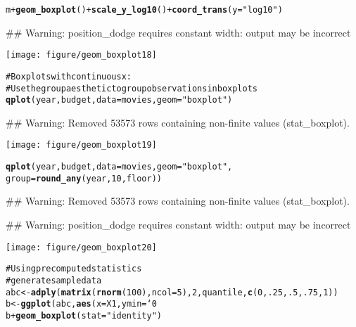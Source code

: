 \documentclass[a4paper,titlepage]{tufte-handout}\usepackage{graphicx, color}
\makeatletter
\def\maxwidth{ %
  \ifdim\Gin@nat@width>\linewidth
    \linewidth
  \else
    \Gin@nat@width
  \fi
}
\newcommand{\hlfunctioncall}[1]{\textcolor[rgb]{0.501960784313725,0,0.329411764705882}{\textbf{#1}}}%
\newcommand{\hlstring}[1]{\textcolor[rgb]{0.6,0.6,1}{#1}}%
\newcommand{\hlcomment}[1]{\textcolor[rgb]{0.180392156862745,0.6,0.341176470588235}{#1}}%
\newenvironment{kframe}{%
 \def\at@end@of@kframe{}%
 \ifinner\ifhmode%
  \def\at@end@of@kframe{\end{minipage}}%
  \begin{minipage}{\columnwidth}%
 \fi\fi%
 \def\FrameCommand##1{\hskip\@totalleftmargin \hskip-\fboxsep
 \colorbox{shadecolor}{##1}\hskip-\fboxsep
     \hskip-\linewidth \hskip-\@totalleftmargin \hskip\columnwidth}%
 \MakeFramed {\advance\hsize-\width
   \@totalleftmargin\z@ \linewidth\hsize
   \@setminipage}}%
 {\par\unskip\endMakeFramed%
 \at@end@of@kframe}
\newenvironment{knitrout}{}{} %
\makeatother
\begin{document}
\begin{knitrout}
\begin{kframe}
\begin{alltt}
m + \hlfunctioncall{geom_boxplot}() + \hlfunctioncall{scale_y_log10}() + \hlfunctioncall{coord_trans}(y = \hlstring{"log10"})
\end{alltt}
\begin{flushleft}\ttfamily\noindent\textcolor{warningcolor}{\#\# Warning: position\_dodge requires constant width: output may be incorrect}\end{flushleft}\end{kframe}\texttt{[image: figure/geom\_boxplot18]} \begin{kframe}\begin{alltt}
\hlcomment{# Boxplots with continuous x:}
\hlcomment{# Use the group aesthetic to group observations in boxplots}
\hlfunctioncall{qplot}(year, budget, data = movies, geom = \hlstring{"boxplot"})
\end{alltt}
\begin{flushleft}\ttfamily\noindent\textcolor{warningcolor}{\#\# Warning: Removed 53573 rows containing non-finite values (stat\_boxplot).}\end{flushleft}\end{kframe}\texttt{[image: figure/geom\_boxplot19]} \begin{kframe}\begin{alltt}
\hlfunctioncall{qplot}(year, budget, data = movies, geom = \hlstring{"boxplot"},
  group = \hlfunctioncall{round_any}(year, 10, floor))
\end{alltt}
\begin{flushleft}\ttfamily\noindent\textcolor{warningcolor}{\#\# Warning: Removed 53573 rows containing non-finite values (stat\_boxplot).}\end{flushleft}\begin{flushleft}\ttfamily\noindent\textcolor{warningcolor}{\#\# Warning: position\_dodge requires constant width: output may be incorrect}\end{flushleft}\end{kframe}\texttt{[image: figure/geom\_boxplot20]} \begin{kframe}\begin{alltt}
\hlcomment{# Using precomputed statistics}
\hlcomment{# generate sample data}
abc <- \hlfunctioncall{adply}(\hlfunctioncall{matrix}(\hlfunctioncall{rnorm}(100), ncol = 5), 2, quantile, \hlfunctioncall{c}(0, .25, .5, .75, 1))
b <- \hlfunctioncall{ggplot}(abc, \hlfunctioncall{aes}(x = X1, ymin = `0%`, lower = `25%`, middle = `50%`, upper = `75%`, ymax = `100%`))
b + \hlfunctioncall{geom_boxplot}(stat = \hlstring{"identity"})

\end{alltt}
\end{kframe}
\end{knitrout}
\end{document}
